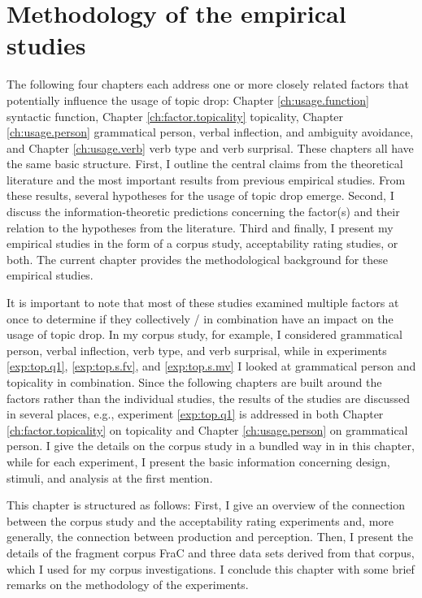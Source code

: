 \chapter{Methodology of the empirical studies} \label{ch:methodology}
The following four chapters each address one or more closely related factors that potentially influence the usage of topic drop:
Chapter \ref{ch:usage.function} syntactic function, Chapter \ref{ch:factor.topicality} topicality, Chapter \ref{ch:usage.person} grammatical person, verbal inflection, and ambiguity avoidance, and Chapter \ref{ch:usage.verb} verb type and verb surprisal.
These chapters all have the same basic structure.
First, I outline the central claims from the theoretical literature and the most important results from previous empirical studies.
From these results, several hypotheses for the usage of topic drop emerge.
Second, I discuss the information-theoretic predictions concerning the factor(s) and their relation to the hypotheses from the literature.
Third and finally, I present my empirical studies in the form of a corpus study, acceptability rating studies, or both.
The current chapter provides the methodological background for these empirical studies.

It is important to note that most of these studies examined multiple factors at once to determine if they collectively / in combination have an impact on the usage of topic drop.
In my corpus study, for example, I considered grammatical person, verbal inflection, verb type, and verb surprisal, while in experiments \ref*{exp:top.q1}, \ref*{exp:top.s.fv}, and \ref*{exp:top.s.mv} I looked at grammatical person and topicality in combination.
Since the following chapters are built around the factors rather than the individual studies, the results of the studies are discussed in several places, e.g., experiment \ref*{exp:top.q1} is addressed in both Chapter \ref{ch:factor.topicality} on topicality and Chapter \ref{ch:usage.person} on grammatical person.
I give the details on the corpus study in a bundled way in  in this chapter, while for each experiment, I present the basic information concerning design, stimuli, and analysis at the first mention.

This chapter is structured as follows:
First, I give an overview of the connection between the corpus study and the acceptability rating experiments and, more generally, the connection between production and perception.
Then, I present the details of the fragment corpus FraC and three data sets derived from that corpus, which I used for my corpus investigations.
I conclude this chapter with some brief remarks on the methodology of the experiments.

